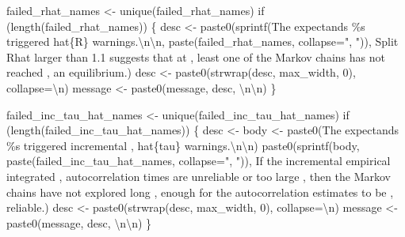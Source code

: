 \documentclass[
  letterpaper,
  DIV=11,
  numbers=noendperiod]{scrartcl}
\newenvironment{Shaded}{\begin{snugshade}}{\end{snugshade}}
\newcommand{\CharTok}[1]{\textcolor[rgb]{0.13,0.47,0.30}{#1}}
\newcommand{\ControlFlowTok}[1]{\textcolor[rgb]{0.00,0.23,0.31}{#1}}
\newcommand{\DecValTok}[1]{\textcolor[rgb]{0.68,0.00,0.00}{#1}}
\newcommand{\NormalTok}[1]{\textcolor[rgb]{0.00,0.23,0.31}{#1}}
\newcommand{\OperatorTok}[1]{\textcolor[rgb]{0.37,0.37,0.37}{#1}}
\newcommand{\SpecialCharTok}[1]{\textcolor[rgb]{0.37,0.37,0.37}{#1}}
\newcommand{\StringTok}[1]{\textcolor[rgb]{0.13,0.47,0.30}{#1}}
\begin{document}
\begin{Shaded}
\begin{Highlighting}[]
\NormalTok{  failed\_rhat\_names }\OperatorTok{\textless{}{-}}\NormalTok{ unique(failed\_rhat\_names)}
  \ControlFlowTok{if}\NormalTok{ (length(failed\_rhat\_names)) \{}
\NormalTok{    desc }\OperatorTok{\textless{}{-}} 
\NormalTok{      paste0(sprintf(}\StringTok{\textquotesingle{}The expectands }\SpecialCharTok{\%s}\StringTok{ triggered hat}\SpecialCharTok{\{R\}}\StringTok{ warnings.}\CharTok{\textbackslash{}n\textbackslash{}n}\StringTok{\textquotesingle{}}\NormalTok{,}
\NormalTok{             paste(failed\_rhat\_names, collapse}\OperatorTok{=}\StringTok{", "}\NormalTok{)),}
             \StringTok{\textquotesingle{}  Split Rhat larger than 1.1 suggests that at \textquotesingle{}}\NormalTok{,}
             \StringTok{\textquotesingle{}least one of the Markov chains has not reached \textquotesingle{}}\NormalTok{,}
             \StringTok{\textquotesingle{}an equilibrium.\textquotesingle{}}\NormalTok{)}
\NormalTok{    desc }\OperatorTok{\textless{}{-}}\NormalTok{ paste0(strwrap(desc, max\_width, }\DecValTok{0}\NormalTok{), collapse}\OperatorTok{=}\StringTok{\textquotesingle{}}\CharTok{\textbackslash{}n}\StringTok{\textquotesingle{}}\NormalTok{)}
\NormalTok{    message }\OperatorTok{\textless{}{-}}\NormalTok{ paste0(message, desc, }\StringTok{\textquotesingle{}}\CharTok{\textbackslash{}n\textbackslash{}n}\StringTok{\textquotesingle{}}\NormalTok{)}
\NormalTok{  \}}
  
\NormalTok{  failed\_inc\_tau\_hat\_names }\OperatorTok{\textless{}{-}}\NormalTok{ unique(failed\_inc\_tau\_hat\_names)}
  \ControlFlowTok{if}\NormalTok{ (length(failed\_inc\_tau\_hat\_names)) \{}
\NormalTok{    desc }\OperatorTok{\textless{}{-}}
\NormalTok{      body }\OperatorTok{\textless{}{-}}\NormalTok{ paste0(}\StringTok{\textquotesingle{}The expectands }\SpecialCharTok{\%s}\StringTok{ triggered incremental \textquotesingle{}}\NormalTok{,}
                     \StringTok{\textquotesingle{}hat}\SpecialCharTok{\{tau\}}\StringTok{ warnings.}\CharTok{\textbackslash{}n\textbackslash{}n}\StringTok{\textquotesingle{}}\NormalTok{)}
\NormalTok{      paste0(sprintf(body,}
\NormalTok{                     paste(failed\_inc\_tau\_hat\_names, collapse}\OperatorTok{=}\StringTok{", "}\NormalTok{)),}
             \StringTok{\textquotesingle{}If the incremental empirical integrated \textquotesingle{}}\NormalTok{,}
             \StringTok{\textquotesingle{}autocorrelation times are unreliable or too large \textquotesingle{}}\NormalTok{,}
             \StringTok{\textquotesingle{}then the Markov chains have not explored long \textquotesingle{}}\NormalTok{,}
             \StringTok{\textquotesingle{}enough for the autocorrelation estimates to be \textquotesingle{}}\NormalTok{,}
             \StringTok{\textquotesingle{}reliable.\textquotesingle{}}\NormalTok{)}
\NormalTok{    desc }\OperatorTok{\textless{}{-}}\NormalTok{ paste0(strwrap(desc, max\_width, }\DecValTok{0}\NormalTok{), collapse}\OperatorTok{=}\StringTok{\textquotesingle{}}\CharTok{\textbackslash{}n}\StringTok{\textquotesingle{}}\NormalTok{)}
\NormalTok{    message }\OperatorTok{\textless{}{-}}\NormalTok{ paste0(message, desc, }\StringTok{\textquotesingle{}}\CharTok{\textbackslash{}n\textbackslash{}n}\StringTok{\textquotesingle{}}\NormalTok{)}
\NormalTok{  \}}


\end{Highlighting}
\end{Shaded}
\end{document}

